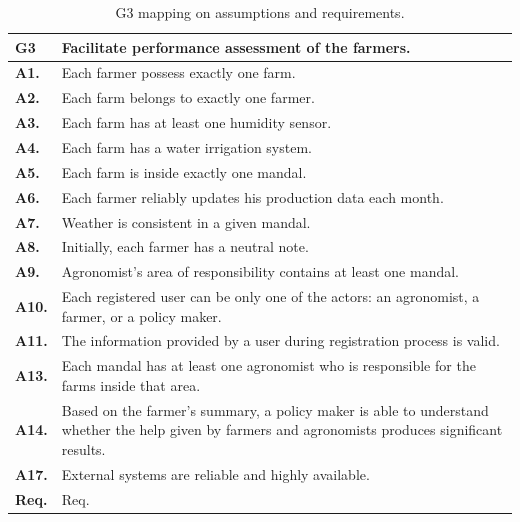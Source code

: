 \begin{table}[H]
\centering
    \begin{tabularx}{\linewidth}{lX} \toprule
        \textbf{G3} & Facilitate performance assessment of the farmers. \\ 
        \midrule
        \textbf{A1.} & Each farmer possess exactly one farm.\\
        \textbf{A2.} & Each farm belongs to exactly one farmer.\\ 
        \textbf{A3.} & Each farm has at least one humidity sensor.\\ 
        \textbf{A4.} & Each farm has a water irrigation system.\\ 
        \textbf{A5.} & Each farm is inside exactly one mandal.\\ 
        \textbf{A6.} & Each farmer reliably updates his production data each month.\\ 
        \textbf{A7.} & Weather is consistent in a given mandal.\\ 
        \textbf{A8.} & Initially, each farmer has a neutral note.\\ 
        \textbf{A9.} & Agronomist's area of responsibility contains at least one mandal.\\ 
        \textbf{A10.} & Each registered user can be only one of the actors: an agronomist, a farmer, or a policy maker.\\ 
        \textbf{A11.} & The information provided by a user during registration process is valid.\\ 
        \textbf{A13.} & Each mandal has at least one agronomist who is responsible for the farms inside that area.\\ 
        \textbf{A14.} & Based on the farmer's summary, a policy maker is able to understand whether the help given by farmers and agronomists produces significant results.\\ 
        \textbf{A17.} & External systems are reliable and highly available.\\
        \midrule
        \textbf{Req.} & Req.\\
        \bottomrule
    \end{tabularx}
    \caption{G3 mapping on assumptions and requirements.}
\end{table}

